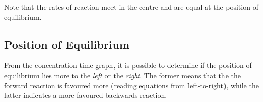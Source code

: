 				Note that the rates of reaction meet in the centre and are equal at the position of equilibrium.




		\subsection{Position of Equilibrium}

			From the concentration-time graph, it is possible to determine if the position of equilibrium lies more to the \textit{left} or the
			\textit{right}. The former means that the the forward reaction is favoured more (reading equations from left-to-right), while the
			latter indicates a more favoured backwards reaction.



